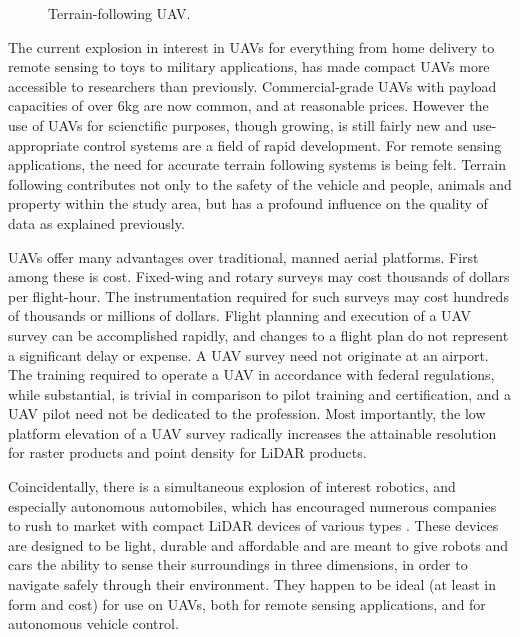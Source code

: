 \documentclass[10pt]{report}
\begin{document}
\begin{figure}
\centering
\def\svgscale{0.5}

\caption{Terrain-following UAV.}
\label{fig:uav_terrain}
\end{figure}

The current explosion in interest in UAVs for everything from home delivery to remote sensing to toys to military applications, has made compact UAVs more accessible to researchers than previously. Commercial-grade UAVs with payload capacities of over 6kg are now common, and at reasonable prices. However the use of UAVs for scienctific purposes, though growing, is still fairly new and use-appropriate control systems are a field of rapid development. For remote sensing applications, the need for accurate terrain following systems is being felt. Terrain following contributes not only to the safety of the vehicle and people, animals and property within the study area, but has a profound influence on the quality of data as explained previously.

UAVs offer many advantages over traditional, manned aerial platforms. First among these is cost. Fixed-wing and rotary surveys may cost thousands of dollars per flight-hour. The instrumentation required for such surveys may cost hundreds of thousands or millions  of dollars. Flight planning and execution of a UAV survey can be accomplished rapidly, and changes to a flight plan do not represent a significant delay or expense. A UAV survey need not originate at an airport. The training required to operate a UAV in accordance with federal regulations, while substantial, is trivial in comparison to pilot training and certification, and a UAV pilot need not be dedicated to the profession. Most importantly, the low platform elevation of a UAV survey radically increases the attainable resolution for raster products and point density for LiDAR products.

Coincidentally, there is a simultaneous explosion of interest robotics, and especially autonomous automobiles, which has encouraged numerous companies to rush to market with compact LiDAR devices of various types \cite{Quanergy2017,Dormehl2017,Morin2017}. These devices are designed to be light, durable and affordable and are meant to give robots and cars the ability to sense their surroundings in three dimensions, in order to navigate safely through their environment. They happen to be ideal (at least in form and cost) for use on UAVs, both for remote sensing applications, and for autonomous vehicle control.
\end{document}
